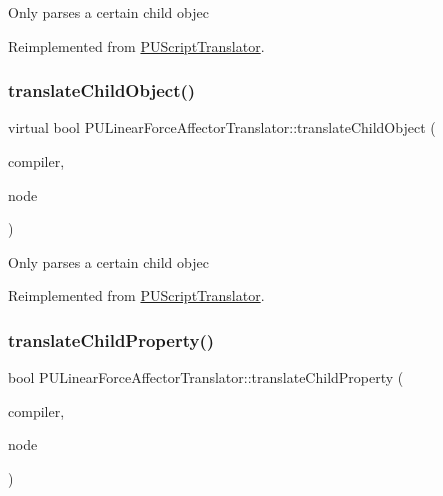 Only parses a certain child objec 

Reimplemented from \hyperlink{classPUScriptTranslator_ab587d01348ae3e678cb700c719b2b113}{P\+U\+Script\+Translator}.

\mbox{\label{classPULinearForceAffectorTranslator_a17986b988b7509a75b39bd9f41877d9c}} 
\subsubsection{\texorpdfstring{translate\+Child\+Object()}{translateChildObject()}\hspace{0.1cm}{\footnotesize\ttfamily [2/2]}}
{\footnotesize\ttfamily virtual bool P\+U\+Linear\+Force\+Affector\+Translator\+::translate\+Child\+Object (\begin{DoxyParamCaption}\item[{\hyperlink{classPUScriptCompiler}{P\+U\+Script\+Compiler} $\ast$}]{compiler,  }\item[{\hyperlink{classPUAbstractNode}{P\+U\+Abstract\+Node} $\ast$}]{node }\end{DoxyParamCaption})\hspace{0.3cm}{\ttfamily [virtual]}}

Only parses a certain child objec 

Reimplemented from \hyperlink{classPUScriptTranslator_ab587d01348ae3e678cb700c719b2b113}{P\+U\+Script\+Translator}.

\mbox{\label{classPULinearForceAffectorTranslator_a83673e5f8fc1494b7e2fd755bc9f2381}} 
\subsubsection{\texorpdfstring{translate\+Child\+Property()}{translateChildProperty()}\hspace{0.1cm}{\footnotesize\ttfamily [1/2]}}
{\footnotesize\ttfamily bool P\+U\+Linear\+Force\+Affector\+Translator\+::translate\+Child\+Property (\begin{DoxyParamCaption}\item[{\hyperlink{classPUScriptCompiler}{P\+U\+Script\+Compiler} $\ast$}]{compiler,  }\item[{\hyperlink{classPUAbstractNode}{P\+U\+Abstract\+Node} $\ast$}]{node }\end{DoxyParamCaption})\hspace{0.3cm}{\ttfamily [virtual]}}


